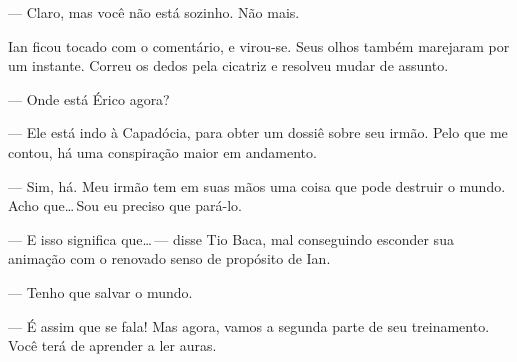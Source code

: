 --- Claro, mas você não está sozinho. Não mais.

Ian ficou tocado com o comentário, e virou-se. Seus olhos também
marejaram por um instante. Correu os dedos pela cicatriz e resolveu
mudar de assunto.

--- Onde está Érico agora?

--- Ele está indo à Capadócia, para obter um dossiê sobre seu irmão.
Pelo que me contou, há uma conspiração maior em andamento.

--- Sim, há. Meu irmão tem em suas mãos uma coisa que pode destruir o
mundo. Acho que\ldots\,Sou eu preciso que pará-lo.

--- E isso significa que\ldots\,--- disse Tio Baca, mal conseguindo
esconder sua animação com o renovado senso de propósito de Ian.

--- Tenho que salvar o mundo.

--- É assim que se fala! Mas agora, vamos a segunda parte de seu
treinamento. Você terá de aprender a ler auras.
